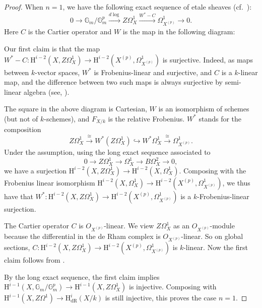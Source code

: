 \documentclass[a4paper,12pt,twoside]{report}
\newcommand{\G}{\mathbb{G}}
\newcommand{\dR}{\mathrm{dR}}
\newcommand{\HH}{\mathrm{H}}
\newcommand{\spec}{\mathrm{spec}}
\begin{document}
\begin{proof}
     
When $n=1$, we have the following exact sequence of etale sheaves (cf.~\cite[Proposition 0.2.1.18]{Il1}):
\[0\rightarrow \G_m/\G_m^{p} \xrightarrow[]{d\log} Z\Omega_X^1 \xrightarrow[]{W^*-C} \Omega_{X^{(p)}}^1 \rightarrow 0.\]
Here $C$ is the Cartier operator and $W$ is the map in the following diagram: 
\begin{center}
\end{center}

Our first claim is that the map $W^*-C: \HH^{i-2}(X,Z\Omega_X^1) \rightarrow \HH^{i-2}(X^{(p)},\Omega_{X^{(p)}}^1)$ is surjective. 
Indeed, as maps between $k$-vector spaces, $W^*$ is Frobenius-linear and surjective, 
and $C$ is a $k$-linear map, and
the difference between two such maps is always surjective by semi-linear algebra 
(see, \cite[Lemma II.5.3]{Il1}).

The square in the above diagram is Cartesian, $W$ is an isomorphism of schemes (but 
not of $k$-schemes), and $F_{X/k}$ is the relative Frobenius. 
$W^*$ stands for the composition \[Z\Omega_X^1 \xrightarrow[]{\cong} W^*(Z\Omega_X^1) \hookrightarrow W^*\Omega_X^1 \xrightarrow[]{\cong} \Omega_{X^{(p)}}^1.\]
Under the assumption, using the long exact sequence associated to \[0\rightarrow Z\Omega^1_X \rightarrow \Omega_X^1 \rightarrow B\Omega^2_X \rightarrow 0,\] 
we have a surjection $\HH^{i-2}(X,Z\Omega^1_X)\rightarrow \HH^{i-2}(X,\Omega^1_X)$. 
Composing with the Frobenius linear isomorphism $\HH^{i-2}(X,\Omega^1_X) \rightarrow \HH^{i-2}(X^{(p)},\Omega^1_{X^{(p)}})$, 
we thus have that $W^*:\HH^{i-2}(X,Z\Omega^1_X) \rightarrow \HH^{i-2}(X^{(p)},\Omega_{X^{(p)}}^1)$ is a $k$-Frobenius-linear surjection. 

The Cartier operator $C$ is $O_{X^{(p)}}$-linear.
We view $Z\Omega_X^1$ as an $O_{X^{(p)}}$-module because the differential in the de Rham complex is $O_{X^{(p)}}$-linear. 
So on global sections, $C: \HH^{i-2}(X,Z\Omega_X^1) \rightarrow \HH^{i-2}(X^{(p)},\Omega^1_{X^{(p)}})$ is $k$-linear. 
Now the first claim follows from \cite[Lemma II.5.3]{Il1}. 

By the long exact sequence, the first claim implies $\HH^{i-1}(X,\G_m/\G_m^{p}) \rightarrow \HH^{i-1}(X,Z\Omega_X^1)$ is injective. 
Composing with $\HH^{i-1}(X,Z\Omega^1) \rightarrow \HH^{i}_{\dR}(X/k)$ is still injective, this proves the case $n=1$. 


\end{proof}
\end{document}

